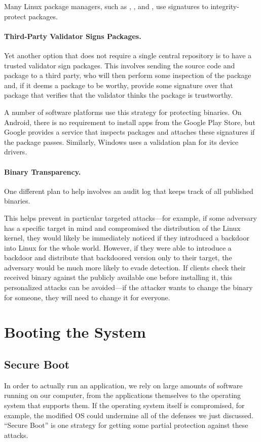Many Linux package managers, such 
as , , and , use 
signatures to integrity-protect packages.



\paragraph{Third-Party Validator Signs Packages.}
Yet another option that does not require a single central repository is to have a trusted validator sign packages. This involves sending the source code and package to a third party, who will then perform some inspection of the package and, if it deems a package to be worthy, provide some signature over that package that verifies that the validator thinks the package is trustworthy.

A number of software platforms use this strategy for protecting binaries.
On Android, there is no requirement to install apps from the Google Play Store, but Google provides a service that inspects packages and attaches these signatures if the package passes. Similarly, Windows uses a validation plan for its device drivers. 

\paragraph{Binary Transparency.}
One different plan to help involves an audit log that keeps track of all published binaries.

This helps prevent in particular targeted attacks---for example, if some adversary has a specific target in mind and compromised the distribution of the Linux kernel, they would likely be immediately noticed if they introduced a backdoor into Linux for the whole world. However, if they were able to introduce a backdoor and distribute that backdoored version only to their target, the adversary would be much more likely to evade detection. If clients check their received binary against the publicly available one before installing it, this personalized attacks can be avoided---if the attacker wants to change the binary for someone, they will need to change it for everyone.

\section{Booting the System}

\subsection{Secure Boot}
In order to actually run an application, we rely on large amounts of software running on our computer, from the applications themselves to the operating system that supports them.
If the operating system itself is compromised, for example, the modified OS could undermine all of the defenses we just discussed.
``Secure Boot'' is one strategy for getting some partial protection against these attacks.

